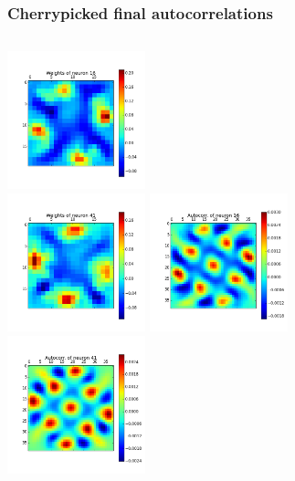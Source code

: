 \begin{frame}
\frametitle{Cherrypicked final autocorrelations}
\begin{columns}[t]
\centering
\includegraphics[width=4cm,height=4cm]{neurons/neuron_w_16.png}\\
\includegraphics[width=4cm,height=4cm]{neurons/neuron_w_41.png}
\centering
\includegraphics[width=4cm,height=4cm]{neurons/neuron_a_16.png}\\
\includegraphics[width=4cm,height=4cm]{neurons/neuron_a_41.png}
\end{columns}
\end{frame}

